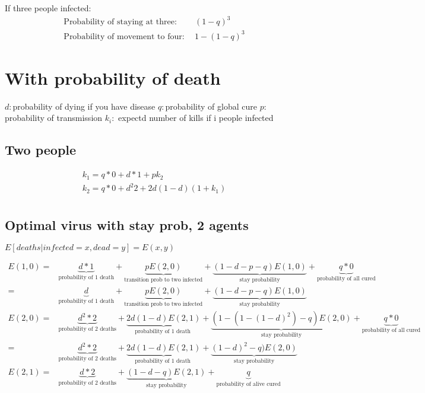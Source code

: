 \documentclass[12pt]{report}
\numberwithin{equation}{section}
\begin{document}
If three people infected:
\begin{align}
\text{Probability of staying at three:}& ~~ (1-q)^3 \\
\text{Probability of movement to four:}& ~~1-(1-q)^3
\end{align}

\section{With probability of death}

$d: $probability of dying if you have disease
$q: $probability of global cure
$p: $probability of transmission
$k_i:$ expectd number of kills if i people infected 

\subsection{Two people}

\begin{align*}
k_1 = q*0+d*1+pk_2 \\
k_2 = q*0+d^2 2 + 2d(1-d)(1+k_1) \\
\end{align*}

\subsection{Optimal virus with stay prob, 2 agents}

$E[deaths | infected=x, dead = y ] = E(x,y) $


\begin{align*}
E(1,0) = &\underbrace{d*1}_\text{probability of 1 death} + 
    \underbrace{pE(2,0) }_\text{transition prob to two infected} +
    \underbrace{(1-d-p-q)E(1,0)}_\text{stay probability} +
    \underbrace{q*0}_\text{probability of all cured} \\
	= &\underbrace{d}_\text{probability of 1 death}+ 
    \underbrace{pE(2,0) }_\text{transition prob to two infected}+ 
    \underbrace{(1-d-p-q)E(1,0)}_\text{stay probability}  \\
E(2,0) = &\underbrace{d^2* 2}_\text{probability of 2 deaths} + 
    \underbrace{2d(1-d)E(2,1) }_\text{probability of 1 death } +
    \underbrace{(1-(1-(1-d)^2)-q)E(2,0) }_\text{stay probability} +
    \underbrace{q*0}_\text{probability of all cured} \\
	   = &\underbrace{d^2* 2}_\text{probability of 2 deaths} + 
    \underbrace{2d(1-d)E(2,1) }_\text{probability of 1 death } +
    \underbrace{(1-d)^2-q)E(2,0) }_\text{stay probability} \\
E(2,1) = &\underbrace{d*2}_\text{probability of 2 deaths} + 
    \underbrace{(1-d-q)E(2,1) }_\text{stay probability} +
    \underbrace{q}_\text{probability of alive cured}
\end{align*}
\end{document}
